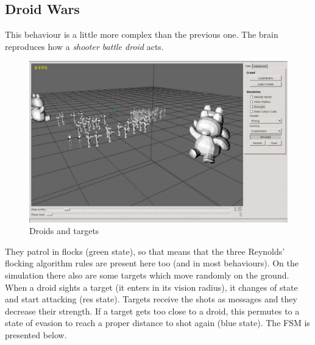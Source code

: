 \newpage
\subsection{Droid Wars}

This behaviour is a little more complex than the previous one. The brain reproduces how a \emph{shooter battle droid} acts. 

\begin{figure}[!h]
  \centering
 \includegraphics[scale=0.5]{droids_01.eps}
  \caption{Droids and targets}
\end{figure}

They patrol in flocks (green state), so that means that the three Reynolds' flocking algorithm rules are present here too (and in most behaviours). On the simulation there also are some targets which move randomly on the ground. When a droid sights a target (it enters in its vision radius), it changes of state and start attacking (res state). Targets receive the shots as messages and they decrease their strength. If a target gets too close to a droid, this permutes to a state of evasion to reach a proper distance to shot again (blue state). The FSM is presented below.

